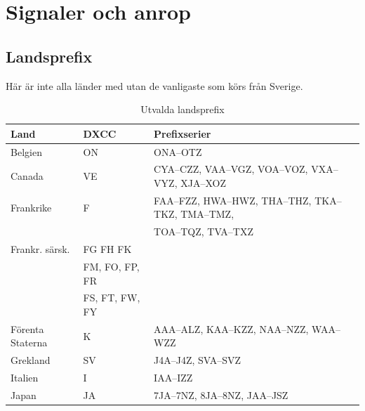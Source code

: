 

\section{Signaler och anrop}
\subsection{Landsprefix}

Här är inte alla länder med utan de vanligaste som körs från Sverige.

\begin{center}
	\begin{footnotesize}
		\begin{longtable}{lll}
			\caption{Utvalda landsprefix} \\
			\textbf{Land}                 & \textbf{DXCC}  & \textbf{Prefixserier}                             \\ \hline
			Belgien                       & ON             & ONA--OTZ                                          \\
			Canada                        & VE             & CYA--CZZ, VAA--VGZ, VOA--VOZ, VXA--VYZ, XJA--XOZ  \\
			Frankrike                     & F              & FAA--FZZ, HWA--HWZ, THA--THZ, TKA--TKZ, TMA--TMZ, \\
			                              &                & TOA--TQZ, TVA--TXZ                                \\
			Frankr. särsk.                & FG FH FK       &                                                   \\
			                              & FM, FO, FP, FR &                                                   \\
			                              & FS, FT, FW, FY &                                                   \\
			Förenta Staterna              & K              & AAA--ALZ, KAA--KZZ, NAA--NZZ, WAA--WZZ            \\
			Grekland                      & SV             & J4A--J4Z, SVA--SVZ                                \\
			Italien                       & I              & IAA--IZZ                                          \\
			Japan                         & JA             & 7JA--7NZ, 8JA--8NZ, JAA--JSZ                      \\

\end{longtable}
\end{footnotesize}
\end{center}
